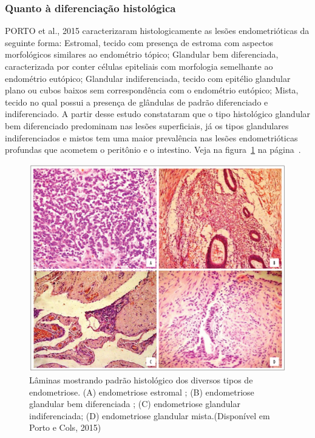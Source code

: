 \documentclass[12pt]{article} %
\begin{document}
\subsubsection{Quanto à diferenciação histológica}

PORTO et al., 2015 caracterizaram histologicamente as lesões
endometrióticas da seguinte forma: Estromal, tecido com presença de
estroma com aspectos morfológicos similares ao endométrio tópico;
Glandular bem diferenciada, caracterizada por conter células
epiteliais com morfologia semelhante ao endométrio eutópico; Glandular
indiferenciada, tecido com epitélio glandular plano ou cubos baixos
sem correspondência com o endométrio eutópico; Mista, tecido no qual
possui a presença de glândulas de padrão diferenciado e
indiferenciado. A partir desse estudo constataram que o tipo
histológico glandular bem diferenciado predominam nas lesões
superficiais, já os tipos glandulares indiferenciados e mistos tem uma
maior prevalência nas lesões endometrióticas profundas que acometem o
peritônio e o intestino. Veja na figura~\ref{histologico} na
página~\pageref{histologico}.


\begin{figure}[h!]
\centering
\includegraphics[width=16cm]{citoendometriose1636.jpg}
\caption[Amostras histológicas de diversos tipos de endometriose]{Lâminas mostrando padrão histológico dos diversos tipos de endometriose. (A) endometriose estromal ; (B) endometriose glandular bem diferenciada ; (C) endometriose glandular indiferenciada; (D) endometriose glandular mista.(Disponível em Porto e Cols, 2015)}
\label{histologico}
\end{figure} 
\end{document}
